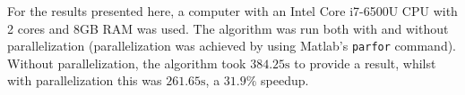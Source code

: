 For the results presented here, a computer with an Intel Core i7-6500U CPU with 2 cores and 8GB RAM was used. The algorithm was run both with and without parallelization (parallelization was achieved by using Matlab's \texttt{parfor} command). Without parallelization, the algorithm took $384.25 \mathrm{s}$ to provide a result, whilst with parallelization this was $261.65 \mathrm{s}$, a  $31.9 \%$ speedup.


